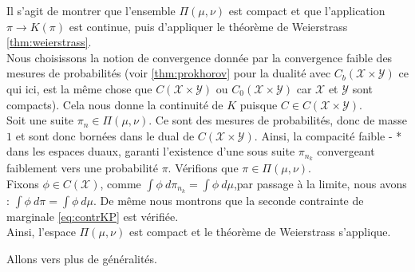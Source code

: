 \documentclass[a4paper,12pt]{article}
\begin{document}
\begin{preuve}
Il s'agit de montrer que l'ensemble $\Pi (\mu,\nu)$ est compact et que l'application $\pi\rightarrow K(\pi )$ est continue, puis d'appliquer le théorème de Weierstrass \eqref{thm:weierstrass}. \\
Nous choisissons la notion de convergence donnée par la convergence faible des mesures de probabilités (voir \eqref{thm:prokhorov} pour la dualité avec $C_b(\mathcal{X}\times\mathcal{Y})$ ce qui ici, est la même chose que $C(\mathcal{X}\times\mathcal{Y})$ ou $C_0(\mathcal{X}\times\mathcal{Y})$ car $\mathcal{X}$ et $\mathcal{Y}$ sont compacts). Cela nous donne la continuité de $K$ puisque $C\in C(\mathcal{X}\times\mathcal{Y})$. \\

Soit une suite $\pi_n\in\Pi (\mu,\nu )$. Ce sont des mesures de probabilités, donc de masse $1$ et sont donc bornées dans le dual de $C(\mathcal{X}\times\mathcal{Y})$. Ainsi, la compacité faible - * dans les espaces duaux, garanti l'existence d'une sous suite $\pi_{n_k}$ convergeant faiblement vers une probabilité $\pi$. 
Vérifions que $\pi \in \Pi (\mu,\nu )$. \\
Fixons $\phi\in C(\mathcal{X})$, comme $\int\phi\ d\pi_{n_k} =\int \phi\ d\mu $,par passage à la limite, nous avons : $\int\phi\ d\pi =\int\phi\ d\mu$. De même nous montrons que la seconde contrainte de marginale \eqref{eq:contrKP} est vérifiée. \\
Ainsi, l'espace $\Pi(\mu,\nu)$ est compact et le théorème de Weierstrass s'applique.
\end{preuve}

Allons vers plus de généralités. 
\end{document}

